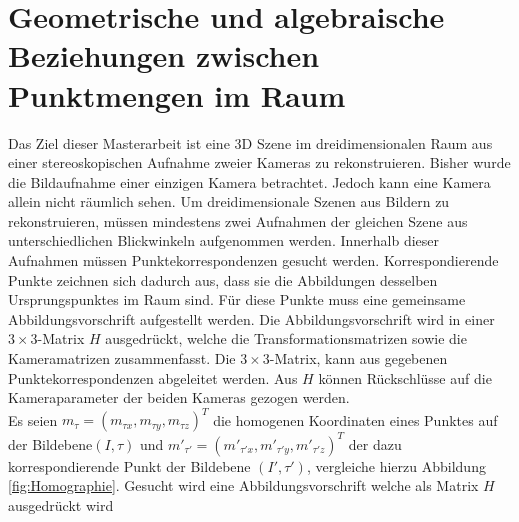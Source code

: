 \chapter{Geometrische und algebraische Beziehungen zwischen Punktmengen im Raum}
\label{sec:HFE}

Das Ziel dieser Masterarbeit ist eine 3D Szene im dreidimensionalen Raum aus einer stereoskopischen Aufnahme zweier Kameras zu rekonstruieren. Bisher wurde die Bildaufnahme einer einzigen Kamera betrachtet. Jedoch kann eine Kamera allein nicht räumlich sehen. Um dreidimensionale Szenen aus Bildern zu rekonstruieren, müssen mindestens zwei Aufnahmen der gleichen Szene aus unterschiedlichen Blickwinkeln aufgenommen werden. Innerhalb dieser Aufnahmen müssen Punktekorrespondenzen gesucht werden. Korrespondierende Punkte zeichnen sich dadurch aus, dass sie die Abbildungen desselben Ursprungspunktes im Raum sind. Für diese Punkte muss eine gemeinsame Abbildungsvorschrift aufgestellt werden. Die Abbildungsvorschrift wird in einer $3 \times 3$-Matrix $H$ ausgedrückt, welche die Transformationsmatrizen sowie die Kameramatrizen zusammenfasst. Die $3 \times 3$-Matrix, kann aus gegebenen Punktekorrespondenzen abgeleitet werden. Aus $H$ können Rückschlüsse auf die Kameraparameter der beiden Kameras gezogen werden.  \\


%

Es seien \ensuremath{m_{\tau} =(m_{\tau x},m_{\tau y},m_{\tau z})^T} die homogenen Koordinaten eines Punktes auf der Bildebene$(I,\tau)$ und \ensuremath{m'_{\tau'} = (m'_{\tau'x},m'_{\tau'y},m'_{\tau'z})^T} der dazu korrespondierende Punkt der Bildebene $(I',\tau')$, vergleiche hierzu Abbildung \ref{fig:Homographie}. Gesucht wird eine Abbildungsvorschrift welche als Matrix $H$ ausgedrückt wird

